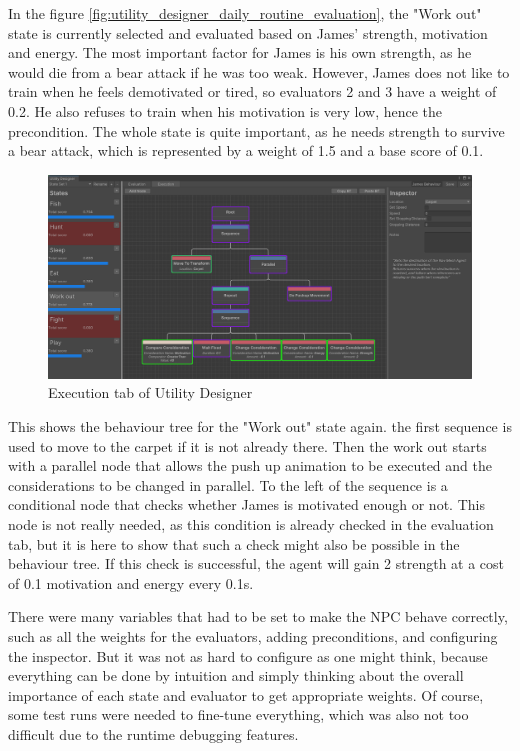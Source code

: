 In the figure \ref{fig:utility_designer_daily_routine_evaluation}, the "Work out" state is currently selected and evaluated based on James' strength, motivation and energy. The most important factor for James is his own strength, as he would die from a bear attack if he was too weak. However, James does not like to train when he feels demotivated or tired, so evaluators 2 and 3 have a weight of 0.2. He also refuses to train when his motivation is very low, hence the precondition. The whole state is quite important, as he needs strength to survive a bear attack, which is represented by a weight of 1.5 and a base score of 0.1.

\begin{figure}[H]
	\centering
		\includegraphics[scale=0.38]{images/utility_designer_survival_execution.png}
	\caption{Execution tab of Utility Designer}
	\label{fig:utility_designer_survival_execution}
\end{figure}

This shows the behaviour tree for the "Work out" state again. the first sequence is used to move to the carpet if it is not already there. Then the work out starts with a parallel node that allows the push up animation to be executed and the considerations to be changed in parallel. To the left of the sequence is a conditional node that checks whether James is motivated enough or not. This node is not really needed, as this condition is already checked in the evaluation tab, but it is here to show that such a check might also be possible in the behaviour tree. If this check is successful, the agent will gain 2 strength at a cost of 0.1 motivation and energy every 0.1s.

There were many variables that had to be set to make the NPC behave correctly, such as all the weights for the evaluators, adding preconditions, and configuring the inspector. But it was not as hard to configure as one might think, because everything can be done by intuition and simply thinking about the overall importance of each state and evaluator to get appropriate weights. Of course, some test runs were needed to fine-tune everything, which was also not too difficult due to the runtime debugging features.